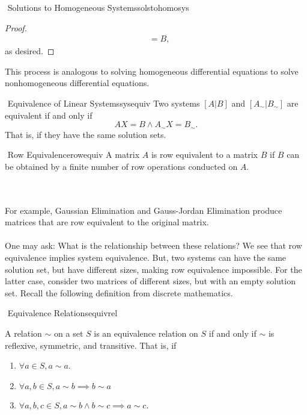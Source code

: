 \begin{theorem}{\Stop\,\,Solutions to Homogeneous Systems}{solstohomosys}
\begin{enumerate}
\begin{proof}
\begin{align*}
                    &=B,
                \end{align*}
                as desired.
            \end{proof}
            This process is analogous to solving homogeneous differential equations to solve nonhomogeneous differential equations.
        \end{enumerate}
    
    \end{theorem}
    \begin{definition}{\Stop\,\,Equivalence of Linear Systems}{sysequiv}
        Two systems \([A|B]\) and \([A_\sim|B_\sim]\) are equivalent if and only if
        \begin{equation*}
            AX=B\wedge A_\sim X=B_\sim.
        \end{equation*}
        That is, if they have the same solution sets.
    \end{definition}
    \begin{definition}{\Stop\,\,Row Equivalence}{rowequiv}
        A matrix \(A\) is row equivalent to a matrix \(B\) if \(B\) can be obtained by a finite number of row operations conducted on \(A\).
    \end{definition}
    \vphantom
    \\
    \\
    For example, Gaussian Elimination and Gauss-Jordan Elimination produce matrices that are row equivalent to the original matrix.
    \\
    \\
    One may ask: What is the relationship between these relations? We see that row equivalence implies system equivalence. But, two systems can have the same solution set, but have different sizes, making row equivalence impossible. For the latter case, consider two matrices of different sizes, but with an empty solution set. Recall the following definition from discrete mathematics.
    \begin{definition}{\Stop\,\,Equivalence Relations}{equivrel}
        
        A relation \(\sim\) on a set \(S\) is an equivalence relation on \(S\) if and only if \(\sim\) is reflexive, symmetric, and transitive. That is, if
        \begin{enumerate}
            \item \(\forall a\in S, a\sim a\).
            \item \(\forall a, b\in S, a\sim b\implies b\sim a\)
            \item \(\forall a, b, c\in S, a\sim b\wedge b\sim c\implies a\sim c\).
        \end{enumerate}
        
    \end{definition}
